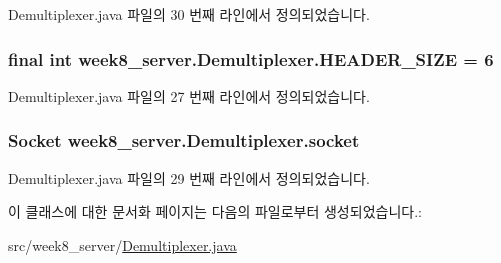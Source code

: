 Demultiplexer.\-java 파일의 30 번째 라인에서 정의되었습니다.

\hypertarget{classweek8__server_1_1_demultiplexer_a5240d883d891045d3cdf5f5497637eb1}{
\subsubsection[{H\-E\-A\-D\-E\-R\-\_\-\-S\-I\-Z\-E}]{\setlength{\rightskip}{0pt plus 5cm}final int week8\-\_\-server.\-Demultiplexer.\-H\-E\-A\-D\-E\-R\-\_\-\-S\-I\-Z\-E = 6\hspace{0.3cm}{\ttfamily [private]}}}\label{classweek8__server_1_1_demultiplexer_a5240d883d891045d3cdf5f5497637eb1}


Demultiplexer.\-java 파일의 27 번째 라인에서 정의되었습니다.

\hypertarget{classweek8__server_1_1_demultiplexer_aa59bc55dc4eed3ea0247a8ea46913262}{
\subsubsection[{socket}]{\setlength{\rightskip}{0pt plus 5cm}Socket week8\-\_\-server.\-Demultiplexer.\-socket\hspace{0.3cm}{\ttfamily [private]}}}\label{classweek8__server_1_1_demultiplexer_aa59bc55dc4eed3ea0247a8ea46913262}


Demultiplexer.\-java 파일의 29 번째 라인에서 정의되었습니다.



이 클래스에 대한 문서화 페이지는 다음의 파일로부터 생성되었습니다.\-:\begin{DoxyCompactItemize}
\item 
src/week8\-\_\-server/\hyperlink{_demultiplexer_8java}{Demultiplexer.\-java}\end{DoxyCompactItemize}
